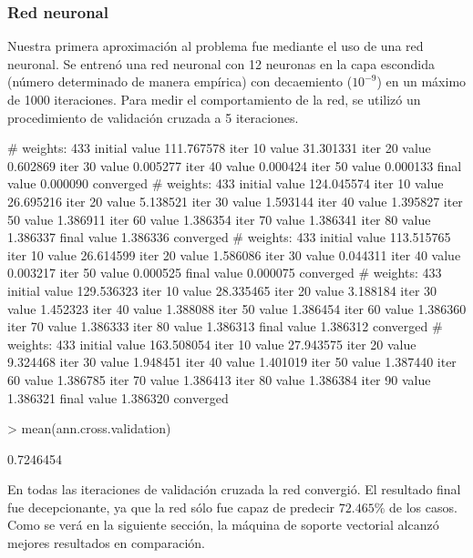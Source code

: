\documentclass{article}
\begin{document}
\subsubsection{Red neuronal}
Nuestra primera aproximación al problema fue mediante el uso de una red neuronal. Se entrenó una red neuronal con 12 neuronas en la capa escondida (número determinado de manera empírica) con decaemiento ($10^{-9}$) en un máximo de 1000 iteraciones. Para medir el comportamiento de la red, se utilizó un procedimiento de validación cruzada a 5 iteraciones.
\begin{Schunk}
\begin{Soutput}
# weights:  433
initial  value 111.767578 
iter  10 value 31.301331
iter  20 value 0.602869
iter  30 value 0.005277
iter  40 value 0.000424
iter  50 value 0.000133
final  value 0.000090 
converged
# weights:  433
initial  value 124.045574 
iter  10 value 26.695216
iter  20 value 5.138521
iter  30 value 1.593144
iter  40 value 1.395827
iter  50 value 1.386911
iter  60 value 1.386354
iter  70 value 1.386341
iter  80 value 1.386337
final  value 1.386336 
converged
# weights:  433
initial  value 113.515765 
iter  10 value 26.614599
iter  20 value 1.586086
iter  30 value 0.044311
iter  40 value 0.003217
iter  50 value 0.000525
final  value 0.000075 
converged
# weights:  433
initial  value 129.536323 
iter  10 value 28.335465
iter  20 value 3.188184
iter  30 value 1.452323
iter  40 value 1.388088
iter  50 value 1.386454
iter  60 value 1.386360
iter  70 value 1.386333
iter  80 value 1.386313
final  value 1.386312 
converged
# weights:  433
initial  value 163.508054 
iter  10 value 27.943575
iter  20 value 9.324468
iter  30 value 1.948451
iter  40 value 1.401019
iter  50 value 1.387440
iter  60 value 1.386785
iter  70 value 1.386413
iter  80 value 1.386384
iter  90 value 1.386321
final  value 1.386320 
converged
\end{Soutput}
\begin{Sinput}
> mean(ann.cross.validation)
\end{Sinput}
\begin{Soutput}
[1] 0.7246454
\end{Soutput}
\end{Schunk}
En todas las iteraciones de validación cruzada la red convergió. El resultado final fue decepcionante, ya que la red sólo fue capaz de predecir $72.465\%$ de los casos. Como se verá en la siguiente sección, la máquina de soporte vectorial alcanzó mejores resultados en comparación.
\end{document}
